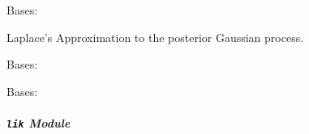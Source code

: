 \documentclass[letterpaper,10pt,english]{sphinxmanual}
\begin{document}

\begin{fulllineitems}
\label{pyGPs.Core:pyGPs.Core.inf.Laplace}
Bases: {\hyperref[Likelihoods:pyGPs.Core.inf.Inference]{}}

Laplace's Approximation to the posterior Gaussian process.

\begin{fulllineitems}
\label{pyGPs.Core:pyGPs.Core.inf.Laplace.proceed}
\end{fulllineitems}


\end{fulllineitems}


\begin{fulllineitems}
\label{pyGPs.Core:pyGPs.Core.inf.dnlZStruct}
Bases: 

\end{fulllineitems}


\begin{fulllineitems}
\label{pyGPs.Core:pyGPs.Core.inf.postStruct}
Bases: 

\end{fulllineitems}



\subparagraph{\texttt{lik} Module}
\label{pyGPs.Core:module-pyGPs.Core.lik}\label{pyGPs.Core:lik-module}
\end{document}
